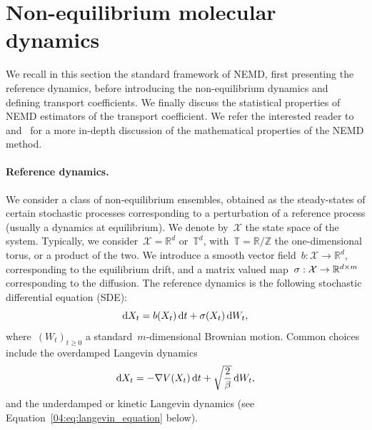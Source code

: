 \section{Non-equilibrium molecular dynamics}\label{04:sec:nemd}
We recall in this section the standard framework of NEMD, first presenting the reference dynamics, before introducing the non-equilibrium dynamics and defining transport coefficients. We finally discuss the statistical properties of NEMD estimators of the transport coefficient. We refer the interested reader to~\cite[Section 5]{LS16} and~\cite{SS23} for a more in-depth discussion of the mathematical properties of the NEMD method.
\paragraph{Reference dynamics.}\label{04:par:ref}
We consider a class of non-equilibrium ensembles, obtained as the steady-states of certain stochastic processes corresponding to a perturbation of a reference process (usually a dynamics at equilibrium).
 We denote by~$\mathcal X$ the state space of the system.
Typically, we consider~$\mathcal X= \mathbb{R}^d$ or~$\mathbb{T}^d$, with~$\mathbb{T}= \mathbb{R}/\mathbb{Z}$ the one-dimensional torus, or a product of the two. We introduce a smooth vector field~$b: \mathcal{X}\to \mathbb{R}^d$, corresponding to the equilibrium drift, and a matrix valued map~$\sigma : \mathcal X\to \mathbb{R}^{d\times m}$ corresponding to the diffusion.
The reference dynamics is the following stochastic differential equation (SDE):
\begin{equation}
    \mathrm{d} X_t = b(X_t)\,\mathrm{d} t +\sigma(X_t)\,\mathrm{d} W_t,
\end{equation}
where~$(W_t)_{t\geq 0}$ a standard~$m$-dimensional Brownian motion.
Common choices include the overdamped Langevin dynamics
\[\mathrm{d} X_t = -\nabla V(X_t)\,\mathrm{d} t + \sqrt{\frac{2}{\beta}}\,\mathrm{d} W_t,\]
and the underdamped or kinetic Langevin dynamics (see Equation~\eqref{04:eq:langevin_equation} below).


